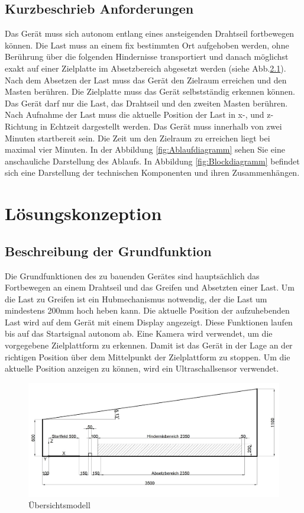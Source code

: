 \documentclass[a4paper]{report}
\begin{document}
\section{Kurzbeschrieb Anforderungen}
\label{sec:KurzAnforder}
Das Gerät muss sich autonom entlang eines ansteigenden Drahtseil fortbewegen können. Die Last muss an einem fix bestimmten Ort aufgehoben werden, ohne Berührung über die folgenden Hindernisse transportiert und danach möglichst exakt auf einer Zielplatte im Absetzbereich abgesetzt werden (siehe Abb.\ref{fig:Funktionsskizze}). Nach dem Absetzen der Last muss das Gerät den Zielraum erreichen und den Masten berühren. Die Zielplatte muss das Gerät selbstständig erkennen können. Das Gerät darf nur die Last, das Drahtseil und den zweiten Masten berühren. Nach Aufnahme der Last muss die aktuelle Position der Last in x-, und z-Richtung in Echtzeit dargestellt werden. Das Gerät muss innerhalb von zwei Minuten startbereit sein. Die Zeit um den Zielraum zu erreichen liegt bei maximal vier Minuten. In der Abbildung \ref{fig:Ablaufdiagramm} sehen Sie eine anschauliche Darstellung des Ablaufs.
In Abbildung \ref{fig:Blockdiagramm} befindet sich eine Darstellung der technischen Komponenten und ihren Zusammenhängen.

\chapter{Lösungskonzeption}
\label{ch:Loesungskonzept}

\section{Beschreibung der Grundfunktion}
\label{sec:GrundBeschrieb}
Die Grundfunktionen des zu bauenden Gerätes sind hauptsächlich das Fortbewegen an einem Drahtseil und das Greifen und Absetzten einer Last. Um die Last zu Greifen ist ein Hubmechanismus notwendig, der die Last um mindestens 200mm hoch heben kann. Die aktuelle Position der aufzuhebenden Last wird auf dem Gerät mit einem Display angezeigt. Diese Funktionen laufen bis auf das Startsignal autonom ab. Eine Kamera wird verwendet, um die vorgegebene Zielplattform zu erkennen. Damit ist das Gerät in der Lage an der richtigen Position über dem Mittelpunkt der Zielplattform zu stoppen. Um die aktuelle Position anzeigen zu können, wird ein Ultraschallsensor verwendet.

\begin{figure}[h!]
	\includegraphics[keepaspectratio,width=\textwidth]{PrenFunktionsskizze}
	\caption{Übersichtsmodell}
	\label{fig:Funktionsskizze}
\end{figure}
\end{document}

